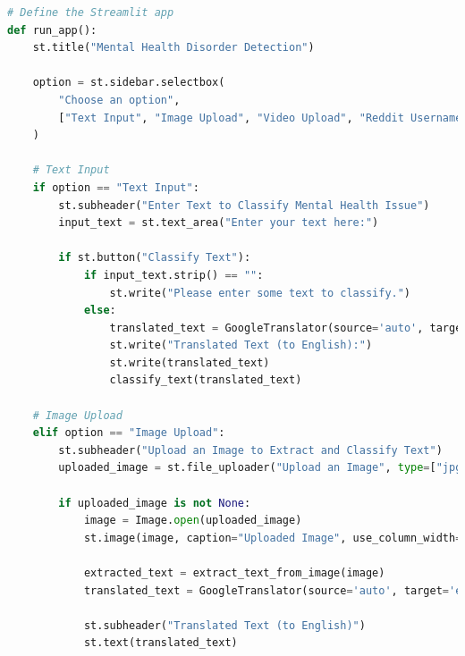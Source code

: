 \begin{tcolorbox}[colback=gray!5!white, colframe=gray!80!black, boxrule=0.5pt, title=Streamlit Mental Health Disorder Detection App]
    \begin{lstlisting}[language=Python]
# Define the Streamlit app
def run_app():
    st.title("Mental Health Disorder Detection")

    option = st.sidebar.selectbox(
        "Choose an option",
        ["Text Input", "Image Upload", "Video Upload", "Reddit Username Analysis"]
    )

    # Text Input
    if option == "Text Input":
        st.subheader("Enter Text to Classify Mental Health Issue")
        input_text = st.text_area("Enter your text here:")

        if st.button("Classify Text"):
            if input_text.strip() == "":
                st.write("Please enter some text to classify.")
            else:
                translated_text = GoogleTranslator(source='auto', target='en').translate(input_text)
                st.write("Translated Text (to English):")
                st.write(translated_text)
                classify_text(translated_text)

    # Image Upload
    elif option == "Image Upload":
        st.subheader("Upload an Image to Extract and Classify Text")
        uploaded_image = st.file_uploader("Upload an Image", type=["jpg", "jpeg", "png", "webp", "bmp", "tiff"])

        if uploaded_image is not None:
            image = Image.open(uploaded_image)
            st.image(image, caption="Uploaded Image", use_column_width=True)

            extracted_text = extract_text_from_image(image)
            translated_text = GoogleTranslator(source='auto', target='en').translate("\n".join(extracted_text))

            st.subheader("Translated Text (to English)")
            st.text(translated_text)
        \end{lstlisting}
    \end{tcolorbox}
